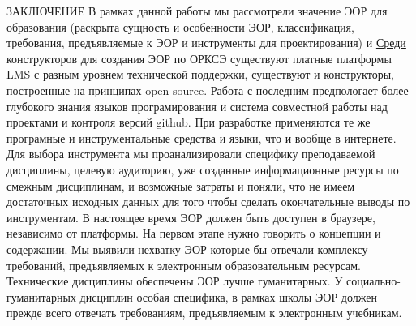 ЗАКЛЮЧЕНИЕ
В рамках данной работы мы рассмотрели значение ЭОР для образования (раскрыта сущность и особенности ЭОР, классификация, требования, предъявляемые к ЭОР и инструменты для проектирования) и \hyperref[goal]{Среди} конструкторов для создания ЭОР по ОРКСЭ существуют платные платформы LMS с разным уровнем технической поддержки, существуют и конструкторы, построенные на принципах open source. Работа с последним предпологает более глубокого знания языков програмирования и система совместной работы над проектами и контроля версий github. При разработке применяются те же програмные и инструментальные средства и языки, что и вообще в интернете. Для выбора инструмента мы проанализировали специфику преподаваемой дисциплины, целевую аудиторию, уже созданные информационные ресурсы по смежным дисциплинам, и возможные затраты и поняли, что не имеем достаточных исходных данных для того чтобы сделать окончательные выводы по инструментам. В настоящее время ЭОР должен быть доступен в браузере, независимо от платформы.
На первом этапе нужно говорить о концепции и содержании. Мы выявили нехватку ЭОР которые бы отвечали комплексу требований, предъявляемых к электронным образовательным ресурсам. Технические дисциплины обеспечены ЭОР лучше гуманитарных. У социально-гуманитарных дисциплин особая специфика, в рамках школы ЭОР должен прежде всего отвечать требованиям, предъявляемым к электронным учебникам.